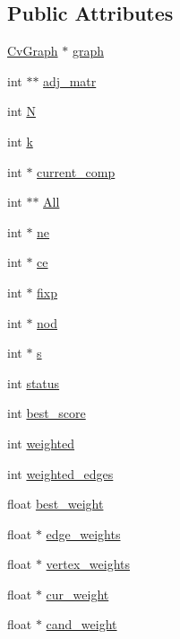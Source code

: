 \subsection*{Public Attributes}
\begin{DoxyCompactItemize}
\item 
\hyperlink{structCvGraph}{Cv\-Graph} $\ast$ \hyperlink{structCvCliqueFinder_ab45a13df90c9becdf0856649a4695efd}{graph}
\item 
int $\ast$$\ast$ \hyperlink{structCvCliqueFinder_abc4e299be1ac4db2e6fbfd51ddb9d065}{adj\-\_\-matr}
\item 
int \hyperlink{structCvCliqueFinder_a8da5566410709f2a7a1891a05e20d6c3}{N}
\item 
int \hyperlink{structCvCliqueFinder_aacc8820053aa06c5482f3d54ccd90549}{k}
\item 
int $\ast$ \hyperlink{structCvCliqueFinder_a00f284454bebac7d8d86e7cca57459fd}{current\-\_\-comp}
\item 
int $\ast$$\ast$ \hyperlink{structCvCliqueFinder_a8929a3dc97b8b146f4b2bea5859559b0}{All}
\item 
int $\ast$ \hyperlink{structCvCliqueFinder_aadfcec5d703a5db394031b79c8f15b83}{ne}
\item 
int $\ast$ \hyperlink{structCvCliqueFinder_a0a757ff7a0febd3628de0eb8f4798fb4}{ce}
\item 
int $\ast$ \hyperlink{structCvCliqueFinder_ab61915448377de08728337a8b30bc97c}{fixp}
\item 
int $\ast$ \hyperlink{structCvCliqueFinder_a38047a358bc1cff9390dc98e1c843e5e}{nod}
\item 
int $\ast$ \hyperlink{structCvCliqueFinder_ae165e8b548245ddbacef0f2953ad7a48}{s}
\item 
int \hyperlink{structCvCliqueFinder_a4d7b6d97430bc4d1cbe3d5a6f76847dc}{status}
\item 
int \hyperlink{structCvCliqueFinder_a27ea88c1685d01c000f2e4853c679eea}{best\-\_\-score}
\item 
int \hyperlink{structCvCliqueFinder_ae93626c5759941f929340fe879380c04}{weighted}
\item 
int \hyperlink{structCvCliqueFinder_a0201060ff64dd9aeb610c64ac27abafe}{weighted\-\_\-edges}
\item 
float \hyperlink{structCvCliqueFinder_a0b6d6e48d2ba4d895b3baa2eebf9d290}{best\-\_\-weight}
\item 
float $\ast$ \hyperlink{structCvCliqueFinder_ae3bb166008a952d59fe0301b020a6dbf}{edge\-\_\-weights}
\item 
float $\ast$ \hyperlink{structCvCliqueFinder_a41aef4f7431fa184acd9b0f60bf1a396}{vertex\-\_\-weights}
\item 
float $\ast$ \hyperlink{structCvCliqueFinder_a92a1736e65341feb05032c65890c29e7}{cur\-\_\-weight}
\item 
float $\ast$ \hyperlink{structCvCliqueFinder_ad2b3a5159f6d0dda8d789d688b014112}{cand\-\_\-weight}
\end{DoxyCompactItemize}


